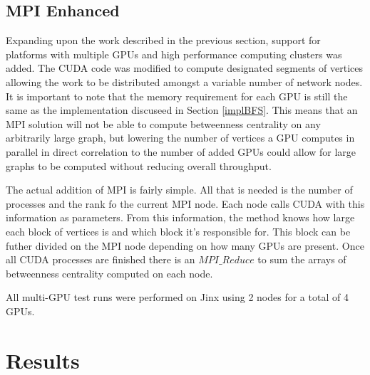 \documentclass[10pt,twocolumn]{article}
\begin{document}
\subsection{MPI Enhanced}
Expanding upon the work described in the previous section, support for platforms with multiple GPUs and high performance computing clusters was added. The CUDA code was modified to compute designated segments of vertices allowing the work to be distributed amongst a variable number of network nodes. It is important to note that the memory requirement for each GPU is still the same as the implementation discuseed in Section \ref{implBFS}. This means that an MPI solution will not be able to compute betweenness centrality on any arbitrarily large graph, but lowering the number of vertices a GPU computes in parallel in direct correlation to the number of added GPUs could allow for large graphs to be computed without reducing overall throughput.

The actual addition of MPI is fairly simple. All that is needed is the number of processes and the rank fo the current MPI node. Each node calls CUDA with this information as parameters. From this information, the method knows how large each block of vertices is and which block it's responsible for. This block can be futher divided on the MPI node depending on how many GPUs are present. Once all CUDA processes are finished there is an $MPI\_Reduce$ to sum the arrays of betweenness centrality computed on each node.

All multi-GPU test runs were performed on Jinx using 2 nodes for a total of 4 GPUs.

\section{Results}
\end{document}
